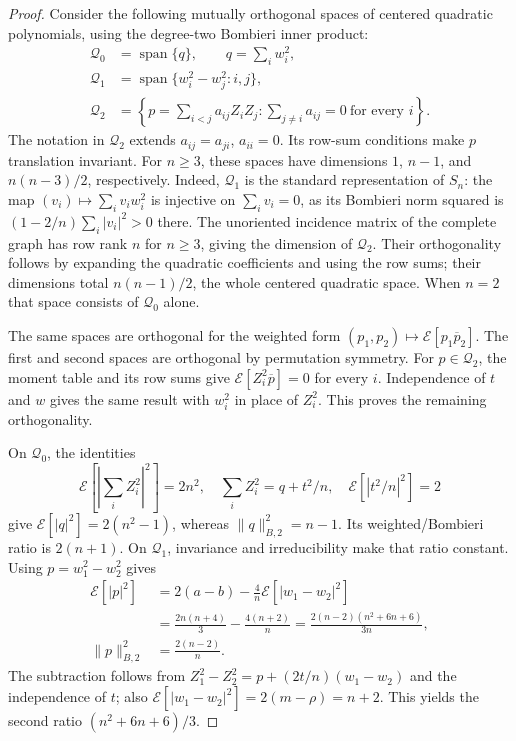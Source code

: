 \documentclass[11pt]{article}
\theoremstyle{remark}
\numberwithin{equation}{section}
\begin{document}
\begin{proof}
Consider the following mutually orthogonal spaces of centered
quadratic polynomials, using the degree-two Bombieri inner product:
\[
 \begin{split}
 \mathcal Q_0&=\operatorname{span}\{q\},\qquad q=\sum_iw_i^2,\\
 \mathcal Q_1&=\operatorname{span}\{w_i^2-w_j^2:i,j\},\\
 \mathcal Q_2&=\left\{p=\sum_{i<j}a_{ij}Z_iZ_j:
                 \sum_{j\ne i}a_{ij}=0\ \text{for every }i\right\}.
 \end{split}
\]
The notation in $\mathcal Q_2$ extends $a_{ij}=a_{ji}$, $a_{ii}=0$.
Its row-sum conditions make $p$ translation invariant.
For $n\ge3$, these spaces have dimensions $1$, $n-1$, and
$n(n-3)/2$, respectively. Indeed, $\mathcal Q_1$ is the standard
representation of $S_n$: the map
$(v_i)\mapsto\sum_iv_iw_i^2$ is injective on $\sum_iv_i=0$,
as its Bombieri norm squared is
$(1-2/n)\sum_i|v_i|^2>0$ there. The unoriented incidence matrix
of the complete graph has row rank $n$ for $n\ge3$, giving the
dimension of $\mathcal Q_2$. Their orthogonality follows by
expanding the quadratic coefficients and using the row sums;
their dimensions total $n(n-1)/2$, the whole centered quadratic
space. When $n=2$ that space consists of $\mathcal Q_0$ alone.

The same spaces are orthogonal for the weighted form
$(p_1,p_2)\mapsto\mathcal E[p_1\overline p_2]$.
The first and second spaces are orthogonal by permutation symmetry.
For $p\in\mathcal Q_2$, the moment table and its row sums give
$\mathcal E[Z_i^2\overline p]=0$ for every $i$. Independence of $t$
and $w$ gives the same result with $w_i^2$ in place of $Z_i^2$.
This proves the remaining orthogonality.

On $\mathcal Q_0$, the identities
\[
 \mathcal E\left[\left|\sum_iZ_i^2\right|^2\right]=2n^2,
 \quad \sum_iZ_i^2=q+t^2/n,
 \quad\mathcal E[|t^2/n|^2]=2
\]
give $\mathcal E[|q|^2]=2(n^2-1)$, whereas
$\|q\|_{B,2}^2=n-1$. Its weighted/Bombieri ratio is $2(n+1)$.
On $\mathcal Q_1$, invariance and irreducibility make that ratio
constant. Using $p=w_1^2-w_2^2$ gives
\[
 \begin{split}
 \mathcal E[|p|^2]
 &=2(a-b)-\frac4n\mathcal E[|w_1-w_2|^2]\\
 &=\frac{2n(n+4)}3-\frac{4(n+2)}n
   =\frac{2(n-2)(n^2+6n+6)}{3n},\\
 \|p\|_{B,2}^2&=\frac{2(n-2)}n.
 \end{split}
\]
The subtraction follows from
$Z_1^2-Z_2^2=p+(2t/n)(w_1-w_2)$ and the independence of $t$;
also $\mathcal E[|w_1-w_2|^2]=2(m-\rho)=n+2$.
This yields the second ratio $(n^2+6n+6)/3$.


\end{proof}
\end{document}
